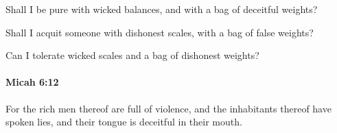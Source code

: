 			\begin{versebox}
					\item[BHS] 
					\item[LXX] 
					\item[ASV] Shall I be pure with wicked balances, and with a bag of deceitful weights?
					\item[NIV] Shall I acquit someone with dishonest scales, with a bag of false weights?
					\item[NRSV] Can I tolerate wicked scales and a bag of dishonest weights?
			\end{versebox}

		\paragraph{Micah 6:12} %
			\label{MICAH-6-12}

			For the rich men thereof are full of violence, and the inhabitants thereof have spoken lies, and their tongue is deceitful in their mouth.

